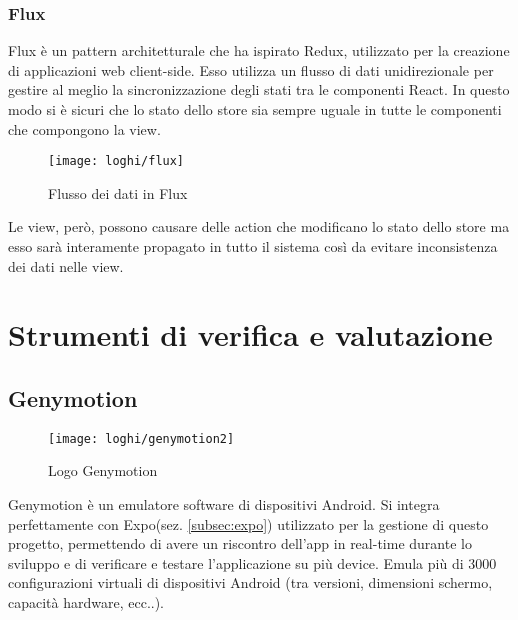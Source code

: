 \subsubsection{Flux} \label{subsubsec:flux}
 Flux è un pattern architetturale che ha ispirato Redux, utilizzato per la 
 creazione di applicazioni web client-side. Esso utilizza un flusso di dati 
 unidirezionale per gestire al meglio la sincronizzazione degli stati tra le 
 componenti React. In questo modo si è sicuri che lo stato dello store sia 
 sempre uguale in tutte le componenti che compongono la view.
 
 \begin{figure}[H] 
 	\centering
 	\texttt{[image: loghi/flux]}
 	\caption{Flusso dei dati in Flux}
 \end{figure}
 Le view, però, possono causare delle action che modificano lo stato dello store 
 ma esso sarà interamente propagato in tutto il sistema così da evitare 
 inconsistenza dei dati nelle view.
 
 
\section{Strumenti di verifica e valutazione}

\subsection{Genymotion}
\begin{figure}[H] 
	\centering
	\texttt{[image: loghi/genymotion2]}
	\caption{Logo Genymotion}
\end{figure}
Genymotion è un emulatore software di dispositivi Android. Si integra 
perfettamente con Expo(sez. \ref{subsec:expo}) utilizzato per la gestione di 
questo progetto, permettendo di avere un riscontro dell'app in real-time durante 
lo sviluppo e di verificare e testare l'applicazione su più device. Emula più 
di 3000 configurazioni virtuali di dispositivi Android (tra versioni, dimensioni 
schermo, capacità hardware, ecc..). 

